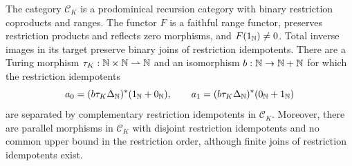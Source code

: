 \begin{proposition}\label{prop:missing-lift}
The category $\mathcal C_K$ is a prodominical recursion category with
binary restriction coproducts and ranges. The functor $F$ is a faithful range functor, preserves restriction products and
reflects zero morphisms, and $F(1_{\mathbb N})\ne0$. Total inverse images
in its target preserve binary joins of restriction idempotents.
There are a Turing morphism
$\tau_K:\mathbb N\times\mathbb N\rightharpoonup\mathbb N$ and an isomorphism
$b:\mathbb N\to\mathbb N+\mathbb N$ for which the restriction idempotents
\[
 a_0=(b\tau_K\Delta_{\mathbb N})^*(1_{\mathbb N}+0_{\mathbb N}),\qquad
 a_1=(b\tau_K\Delta_{\mathbb N})^*(0_{\mathbb N}+1_{\mathbb N})
\]
are separated by complementary restriction idempotents in
$\mathcal C_K$. Moreover, there are parallel morphisms in $\mathcal C_K$
with disjoint restriction idempotents and no common upper bound in
the restriction order, although finite joins of restriction idempotents
exist.
\end{proposition}

